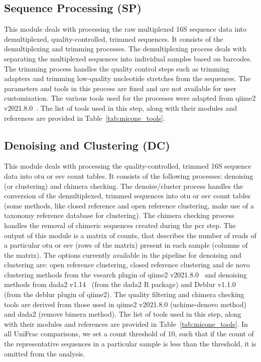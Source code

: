   \subsection*{Sequence Processing (SP)}
  \vspace{-5mm}
  This module deals with processing the raw multiplexed 16S sequence data into demultiplexed, quality-controlled, trimmed sequences.
  It consists of the demultiplexing and trimming processes.
  The demultiplexing process deals with separating the multiplexed sequences into individual samples based on barcodes.
  The trimming process handles the quality control steps such as trimming adapters and trimming low-quality nucleotide stretches from the sequences.
  The parameters and tools in this process are fixed and are not available for user customization.
  The various tools used for the processes were adapted from \ac{qiime2} v2021.8.0~\cite{bolyenReproducibleInteractiveScalable2019}.
  The list of tools used in this step, along with their modules and references are provided in Table~\ref{tab:micone_tools}.

  \subsection*{Denoising and Clustering (DC)}
  \vspace{-5mm}
  This module deals with processing the quality-controlled, trimmed 16S sequence data into \ac{otu} or \ac{esv} count tables.
  It consists of the following processes: denoising (or clustering) and chimera checking.
  The denoise/cluster process handles the conversion of the demultiplexed, trimmed sequences into \ac{otu} or \ac{esv} count tables (some methods, like closed reference and open reference clustering, make use of a taxonomy reference database for clustering).
  The chimera checking process handles the removal of chimeric sequences created during the \ac{pcr} step.
  The output of this module is a matrix of counts, that describes the number of reads of a particular \ac{otu} or \ac{esv} (rows of the matrix) present in each sample (columns of the matrix).
  The options currently available in the pipeline for denoising and clustering are: open reference clustering, closed reference clustering and de novo clustering methods from the vsearch plugin of \ac{qiime2} v2021.8.0~\cite{bolyenReproducibleInteractiveScalable2019} and denoising methods from \ac{dada2} v1.14~\cite{Callahan2016} (from the \ac{dada2} R package) and Deblur v1.1.0~\cite{Amir2017} (from the deblur plugin of \ac{qiime2}).
  The quality filtering and chimera checking tools are derived from those used in \ac{qiime2} v2021.8.0 (uchime-denovo method) and \ac{dada2} (remove bimera method).
  The list of tools used in this step, along with their modules and references are provided in Table~\ref{tab:micone_tools}.
  In all UniFrac comparisons, we set a count threshold of 10, such that if the count of the representative sequences in a particular sample is less than the threshold, it is omitted from the analysis.

